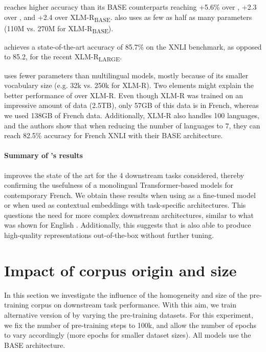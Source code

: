 \camembert reaches higher accuracy than its BASE counterparts reaching +5.6\% over \mbert, +2.3 over \xlmmlmtlm, and +2.4 over XLM-R\textsubscript{BASE}. \camembert also uses as few as half as many parameters (110M vs. 270M for XLM-R\textsubscript{BASE}).

\camembertccnetlarge achieves a state-of-the-art accuracy of 85.7\% on the XNLI benchmark, as opposed to 85.2, for the recent XLM-R\textsubscript{LARGE}.

\camembert uses fewer parameters than multilingual models, mostly because of its smaller vocabulary size (e.g. 32k vs. 250k for XLM-R). Two elements might explain the better performance of \camembert over XLM-R. Even though XLM-R was trained on an impressive amount of data (2.5TB), only 57GB of this data is in French, whereas we used 138GB of French data. Additionally, XLM-R also handles 100 languages, and the authors show that when reducing the number of languages to 7, they can reach 82.5\% accuracy for French XNLI with their BASE architecture.

\paragraph{Summary of \camembert's results}
\camembert improves the state of the art for the 4 downstream tasks considered, thereby confirming the usefulness of a monolingual Transformer-based models for contemporary French. We obtain these results when using \camembert as a fine-tuned model or when used as contextual embeddings with task-specific architectures. This questions the need for more complex downstream architectures, similar to what was shown for English \citep{devlin-etal-2019-bert}. Additionally, this suggests that \camembert is also able to produce high-quality representations out-of-the-box without further tuning.

\section{Impact of corpus origin and size}
\label{sec:origin_and_size}

In this section we investigate the influence of the homogeneity and size of the pre-training corpus on downstream task performance. With this aim, we train alternative version of \camembert by varying the pre-training datasets. For this experiment, we fix the number of pre-training steps to 100k, and allow the number of epochs to vary accordingly (more epochs for smaller dataset sizes). All models use the BASE architecture.


